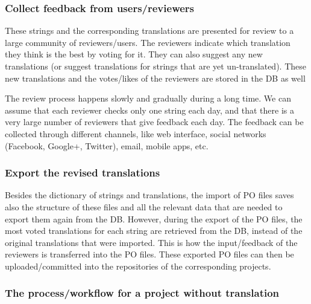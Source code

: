 \documentclass[11pt]{article}
\begin{document}
\subsubsection{Collect feedback from users/reviewers}
\label{sec-8.2.2}


    These strings and the corresponding translations are presented for
    review to a large community of reviewers/users. The reviewers
    indicate which translation they think is the best by voting for it.
    They can also suggest any new translations (or suggest translations
    for strings that are yet un-translated). These new translations and
    the votes/likes of the reviewers are stored in the DB as well

    The review process happens slowly and gradually during a long
    time. We can assume that each reviewer checks only one string each
    day, and that there is a very large number of reviewers that give
    feedback each day. The feedback can be collected through different
    channels, like web interface, social networks (Facebook,
    Google+, Twitter), email, mobile apps, etc.

\subsubsection{Export the revised translations}
\label{sec-8.2.3}


    Besides the dictionary of strings and translations, the import of
    PO files saves also the structure of these files and all the
    relevant data that are needed to export them again from the
    DB. However, during the export of the PO files, the most voted
    translations for each string are retrieved from the DB, instead of
    the original translations that were imported. This is how the
    input/feedback of the reviewers is transferred into the PO
    files. These exported PO files can then be uploaded/committed into
    the repositories of the corresponding projects.

\subsubsection{The process/workflow for a project without translation}
\label{sec-8.2.4}
\end{document}
